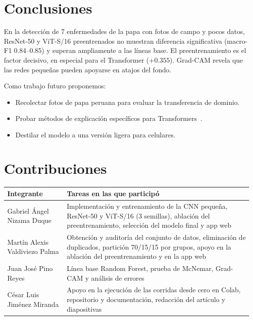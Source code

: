 \documentclass[conference,a4paper]{IEEEtran}
\begin{document}
\section{Conclusiones}
En la detección de 7 enfermedades de la papa con fotos de campo y pocos datos, ResNet-50 y ViT-S/16 preentrenados no muestran diferencia significativa (macro-F1 0.84--0.85) y superan ampliamente a las líneas base. El preentrenamiento es el factor decisivo, en especial para el Transformer ($+0.355$). Grad-CAM revela que las redes pequeñas pueden apoyarse en atajos del fondo.

Como trabajo futuro proponemos:
\begin{itemize}
\item Recolectar fotos de papa peruana para evaluar la transferencia de dominio.
\item Probar métodos de explicación específicos para Transformers~\cite{chefer2021transformer}.
\item Destilar el modelo a una versión ligera para celulares.
\end{itemize}

\section*{Contribuciones}
\begin{center}\small
\begin{tabular}{>{\raggedright\arraybackslash}p{}>{\raggedright\arraybackslash}p{}}
\toprule
Integrante & Tareas en las que participó \\
\midrule
Gabriel Ángel Nizama Duque & Implementación y entrenamiento de la CNN pequeña, ResNet-50 y ViT-S/16 (3 semillas), ablación del preentrenamiento, selección del modelo final y app web \\
Martín Alexis Valdiviezo Palma & Obtención y auditoría del conjunto de datos, eliminación de duplicados, partición 70/15/15 por grupos, apoyo en la ablación del preentrenamiento y en la app web \\
Juan José Pino Reyes & Línea base Random Forest, prueba de McNemar, Grad-CAM y análisis de errores \\
César Luis Jiménez Miranda & Apoyo en la ejecución de las corridas desde cero en Colab, repositorio y documentación, redacción del artículo y diapositivas \\
\bottomrule
\end{tabular}
\end{center}
\end{document}
